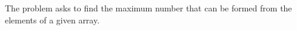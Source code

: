 \documentclass[preview]{standalone}
\begin{document}
The problem asks to find the maximum number that can be formed from the elements of a given array.\\
\end{document}
